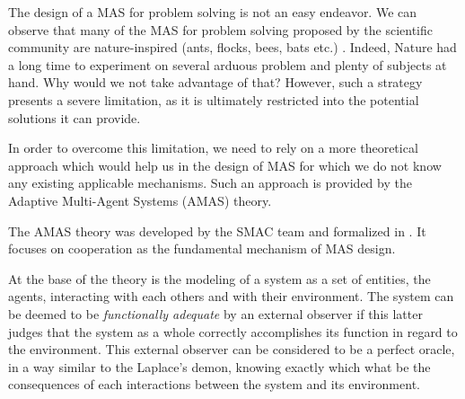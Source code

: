The design of a MAS for problem solving is not an easy endeavor. We can observe that many of the MAS for problem solving proposed by the scientific community are nature-inspired (ants, flocks, bees, bats etc.) \cite{di2011self}. Indeed, Nature had a long time to experiment on several arduous problem and plenty of subjects at hand. Why would we not take advantage of that? However, such a strategy presents a severe limitation, as it is ultimately restricted into the potential solutions it can provide.

In order to overcome this limitation, we need to rely on a more theoretical approach which would help us in the design of MAS for which we do not know any existing applicable mechanisms. Such an approach is provided by the Adaptive Multi-Agent Systems (AMAS) theory.

The AMAS theory was developed by the SMAC team and formalized in \cite{glize2001adaptation}. It focuses on cooperation as the fundamental mechanism of MAS design.


At the base of the theory is the modeling of a system as a set of entities, the agents, interacting with each others and with their environment. The system can be deemed to be \emph{functionally adequate} by an external observer if this latter judges that the system as a whole correctly accomplishes its function in regard to the environment. This external observer can be considered to be a perfect oracle, in a way similar to the Laplace's demon, knowing exactly which what be the consequences of each interactions between the system and its environment.

